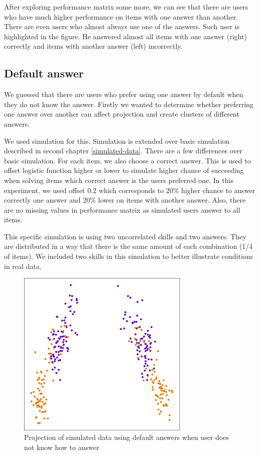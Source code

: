 \documentclass[
  digital, %
  table,   %
  nolof,     %
  nolot,     %
  nocover,
  color,
  final, %
]{fithesis3}
\begin{document}
After exploring performance matrix some more, we can see that there are users who have much higher performance on items with one answer than another. There are even users who almost always use one of the answers. Such user is highlighted in the figure. He answered almost all items with one answer (right) correctly and items with another answer (left) incorrectly.


\subsection{Default answer}\label{default-answer}

We guessed that there are users who prefer using one answer by default when they do not know the answer. Firstly we wanted to determine whether preferring one answer over another can affect projection and create clusters of different answers.

We used simulation for this. Simulation is extended over basic simulation described in second chapter \ref{simulated-data}. There are a few differences over basic simulation. For each item, we also choose a correct answer. This is used to offset logistic function higher or lower to simulate higher chance of succeeding when solving items which correct answer is the users preferred one. In this experiment, we used offset 0.2 which corresponds to 20\% higher chance to answer correctly one answer and 20\% lower on items with another answer. Also, there are no missing values in performance matrix as simulated users answer to all items.

This specific simulation is using two uncorrelated skills and two answers. They are distributed in a way that there is the same amount of each combination (1/4 of items). We included two skills in this simulation to better illustrate conditions in real data.

\begin{figure}
  \includegraphics[height=8cm]{img/simulated_default}
  \caption{Projection of simulated data using default answers when user does not know how to answer}
  \label{fig:simulated_default}
\end{figure}
\end{document}
